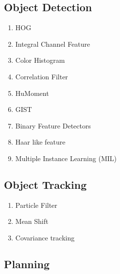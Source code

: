 \subsection{Object Detection}

\begin{enumerate}
    \item HOG
    \item Integral Channel Feature
    \item Color Histogram
    \item Correlation Filter
    \item HuMoment
    \item GIST
    \item Binary Feature Detectors
    \item Haar like feature
    \item Multiple Instance Learning (MIL)
\end{enumerate}

\subsection{Object Tracking}

\begin{enumerate}
    \item Particle Filter
    \item Mean Shift
    \item Covariance tracking
\end{enumerate}

\subsection{Planning}

